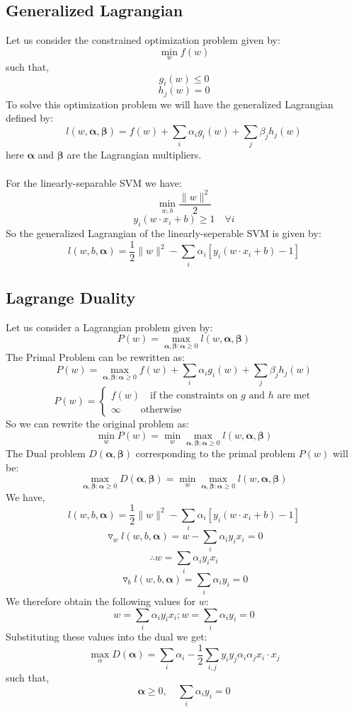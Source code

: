 \documentclass[12pt, a4paper]{book}
\begin{document}
\subsection{Generalized Lagrangian}
Let us consider the constrained optimization problem given by:
$$\min_{w}f(w)$$
such that,
$$g_i(w) \leq 0$$
$$h_j(w) = 0$$
To solve this optimization problem we will have the generalized Lagrangian defined by:
$$l(w,\boldsymbol\alpha,\boldsymbol\beta) = f(w) + \sum_i\alpha_ig_i(w) + \sum_{j}\beta_jh_j(w)$$
here $\boldsymbol\alpha$ and $\boldsymbol\beta$ are the Lagrangian multipliers.\\\\
For the linearly-separable SVM we have:
$$\min_{w,b}\frac{\|w\|^2}{2}$$
$$y_i(w\cdot x_i +b) \geq 1 \quad \forall i$$
So the generalized Lagrangian of the linearly-seperable SVM is given by:
$$l(w,b,\boldsymbol\alpha) = \frac{1}{2}\|w\|^2 - \sum_i\alpha_i\left[y_i(w\cdot x_i + b) - 1\right]$$

\subsection{Lagrange Duality}
Let us consider a Lagrangian problem given by:
$$P(w) = \max_{\boldsymbol\alpha,\boldsymbol\beta:\boldsymbol\alpha\geq0} l(w,\boldsymbol\alpha,\boldsymbol\beta)$$
The Primal Problem can be rewritten as:
$$P(w) = \max_{\boldsymbol\alpha,\boldsymbol\beta:\boldsymbol\alpha\geq0} f(w) + \sum_i\alpha_ig_i(w) + \sum_{j}\beta_jh_j(w)$$
$$P(w) = \begin{cases}
    f(w) \quad \text{if the constraints on $g$ and $h$ are met}\\
    \infty \quad \quad \text{otherwise}
\end{cases}$$
So we can rewrite the original problem as:
$$\min_wP(w) = \min_w\max_{\boldsymbol\alpha,\boldsymbol\beta:\boldsymbol\alpha\geq0} l(w,\boldsymbol\alpha,\boldsymbol\beta)$$
The Dual problem $D(\boldsymbol{\alpha,\boldsymbol{\beta}})$ corresponding to the primal problem $P(w)$ will be:
$$\max_{\boldsymbol\alpha,\boldsymbol\beta:\boldsymbol\alpha\geq0} D(\boldsymbol{\alpha,\boldsymbol{\beta}}) = \min_w\max_{\boldsymbol\alpha,\boldsymbol\beta:\boldsymbol\alpha\geq0} l(w,\boldsymbol\alpha,\boldsymbol\beta)$$
We have,
$$l(w,b,\boldsymbol\alpha) = \frac{1}{2}\|w\|^2 - \sum_i\alpha_i\left[y_i(w\cdot x_i + b) - 1\right]$$
$$\triangledown_wl(w,b,\boldsymbol\alpha) = w - \sum_{i}\alpha_iy_ix_i = 0$$
$$\therefore w = \sum_i\alpha_iy_ix_i$$
$$\triangledown_bl(w,b,\boldsymbol\alpha) = \sum_i\alpha_iy_i = 0$$
We therefore obtain the following values for $w$:
$$w = \sum_i\alpha_iy_ix_i;w = \sum_i\alpha_iy_i = 0$$
Substituting these values into the dual we get:
$$\max_{\alpha}D(\boldsymbol{\alpha}) = \sum_i\alpha_i -\frac{1}{2} \sum_{i,j}y_iy_j\alpha_i\alpha_jx_i\cdot x_j$$
such that,
$$\boldsymbol{\alpha} \geq 0, \quad \sum_i\alpha_iy_i = 0$$
\end{document}
